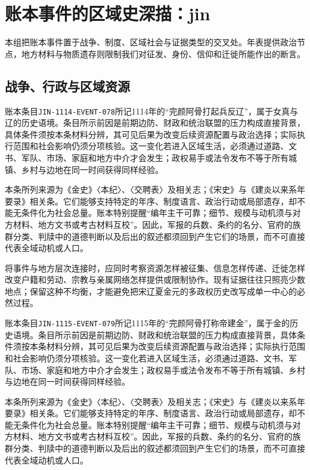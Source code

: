 \section{账本事件的区域史深描：jin}

\label{sec:ledger-depth-jin}

本组把账本事件置于战争、制度、区域社会与证据类型的交叉处。年表提供政治节点，地方材料与物质遗存则限制我们对征发、身份、信仰和迁徙所能作出的断言。

\subsection{战争、行政与区域资源}

账本条目\texttt{JIN-1114-EVENT-078}所记1114年的“完颜阿骨打起兵反辽”，属于女真与辽的历史语境。条目所示前因是前期边防、财政和统治联盟的压力构成直接背景，具体条件须按本条材料分辨，其可见后果为改变后续资源配置与政治选择；实际执行范围和社会影响仍须分项核验。这一变化若进入区域生活，必须通过道路、文书、军队、市场、家庭和地方中介才会发生；政权易手或法令发布不等于所有城镇、乡村与边地在同一时间获得同样经验。

本条所列来源为《金史》〈本纪〉、〈交聘表〉及相关志；《宋史》与《建炎以来系年要录》相关条。它们能够支持特定的年序、制度语言、政治行动或局部遗存，却不能无条件化为社会总量。账本特别提醒“编年主干可靠；细节、规模与动机须与对方材料、地方文书或考古材料互校”。因此，军报的兵数、条约的名分、官府的族群分类、判牍中的道德判断以及后出的叙述都须回到产生它们的场景，而不可直接代表全域动机或人口。

将事件与地方层次连接时，应同时考察资源怎样被征集、信息怎样传递、迁徙怎样改变户籍和劳动、宗教与亲属网络怎样提供或限制协作。现有证据往往只照亮少数地点；保留这种不均衡，才能避免把宋辽夏金元的多政权历史改写成单一中心的必然过程。

账本条目\texttt{JIN-1115-EVENT-079}所记1115年的“完颜阿骨打称帝建金”，属于金的历史语境。条目所示前因是前期边防、财政和统治联盟的压力构成直接背景，具体条件须按本条材料分辨，其可见后果为改变后续资源配置与政治选择；实际执行范围和社会影响仍须分项核验。这一变化若进入区域生活，必须通过道路、文书、军队、市场、家庭和地方中介才会发生；政权易手或法令发布不等于所有城镇、乡村与边地在同一时间获得同样经验。

本条所列来源为《金史》〈本纪〉、〈交聘表〉及相关志；《宋史》与《建炎以来系年要录》相关条。它们能够支持特定的年序、制度语言、政治行动或局部遗存，却不能无条件化为社会总量。账本特别提醒“编年主干可靠；细节、规模与动机须与对方材料、地方文书或考古材料互校”。因此，军报的兵数、条约的名分、官府的族群分类、判牍中的道德判断以及后出的叙述都须回到产生它们的场景，而不可直接代表全域动机或人口。

